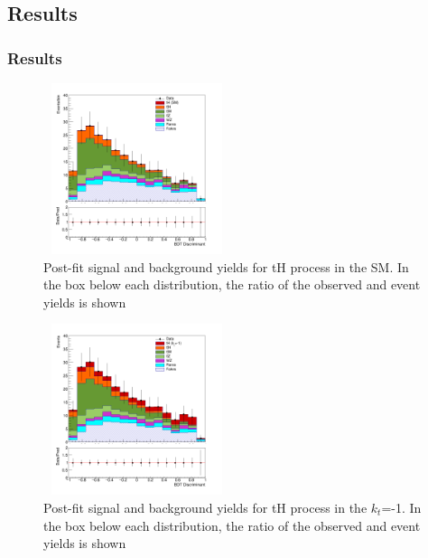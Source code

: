 \documentclass[11pt]{beamer}
\begin{document}
\begin{frame}
\subsection{Results}
\frametitle{Results}
\begin{minipage}{0.4\textwidth}
	\begin{center}
	\begin{figure}
		\includegraphics[width=5.5cm,height=5cm]{figures/simple.png}
		\caption*{\tiny{Post-fit signal and background yields for tH process in the SM. In the
			box below each distribution, the ratio of the observed and  event yields is shown}}
	\end{figure}
\end{center}
\end{minipage}\hfill \quad
\begin{minipage}{0.4\textwidth}
	\begin{center}
	\begin{figure}
		\includegraphics[width=5.5cm,height=5cm]{figures/simple-kt-1.png}
		\caption*{\tiny{Post-fit signal and background yields for tH process in the $k_t$=-1. In the
			box below each distribution, the ratio of the observed and event yields is shown}}
	\end{figure}
\end{center}
\end{minipage}
\end{frame}
\end{document}

